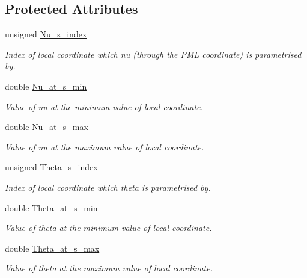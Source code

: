 \subsection*{Protected Attributes}
\begin{DoxyCompactItemize}
\item 
unsigned \hyperlink{classoomph_1_1AnnularFromLocalCoordinatePMLElement_a83bac6e18a318693e37b69f658d522e9}{Nu\+\_\+s\+\_\+index}
\begin{DoxyCompactList}\small\item\em Index of local coordinate which nu (through the P\+ML coordinate) is parametrised by. \end{DoxyCompactList}\item 
double \hyperlink{classoomph_1_1AnnularFromLocalCoordinatePMLElement_ae858cd7ca5348175f26b2d662a607e43}{Nu\+\_\+at\+\_\+s\+\_\+min}
\begin{DoxyCompactList}\small\item\em Value of nu at the minimum value of local coordinate. \end{DoxyCompactList}\item 
double \hyperlink{classoomph_1_1AnnularFromLocalCoordinatePMLElement_abeba5fad805f67b4806361f9c2c43d70}{Nu\+\_\+at\+\_\+s\+\_\+max}
\begin{DoxyCompactList}\small\item\em Value of nu at the maximum value of local coordinate. \end{DoxyCompactList}\item 
unsigned \hyperlink{classoomph_1_1AnnularFromLocalCoordinatePMLElement_ac4bc071b8e8c384504a4a61113ec2ecd}{Theta\+\_\+s\+\_\+index}
\begin{DoxyCompactList}\small\item\em Index of local coordinate which theta is parametrised by. \end{DoxyCompactList}\item 
double \hyperlink{classoomph_1_1AnnularFromLocalCoordinatePMLElement_a6f88cc81d5f43c10da316bd6b56b3fb1}{Theta\+\_\+at\+\_\+s\+\_\+min}
\begin{DoxyCompactList}\small\item\em Value of theta at the minimum value of local coordinate. \end{DoxyCompactList}\item 
double \hyperlink{classoomph_1_1AnnularFromLocalCoordinatePMLElement_ae191ccf4540974d4923b80353955dbf1}{Theta\+\_\+at\+\_\+s\+\_\+max}
\begin{DoxyCompactList}\small\item\em Value of theta at the maximum value of local coordinate. \end{DoxyCompactList}\item 

\end{DoxyCompactItemize}
